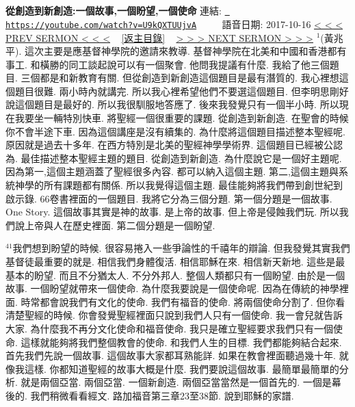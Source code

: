 \documentclass{book}
\begin{document}
\section{}
\label{sec:U9kQXTUUjvA}
\textbf{從創造到新創造:一個故事,一個盼望,一個使命}
\newline
\newline
連結: \href{https://youtube.com/watch?v=U9kQXTUUjvA}{\texttt{ https://youtube.com/watch?v=U9kQXTUUjvA}} ~~~~ 語音日期: 2017-10-16 
\newline
\newline
\hyperref[sec:4SAfUFX37IQ]{\small{< < < PREV SERMON < < <}}
~
\hyperref[sec:index]{\small{[返主目錄]}}
~
\hyperref[sec:Qb_2t8khpeA]{\small{> > > NEXT SERMON > > >}}
\newline
\newline
$^{1}$(黃兆平).
這次主要是應基督神學院的邀請來教導.
基督神學院在北美和中國和香港都有事工.
和橫勝的同工談起說可以有一個聚會.
他問我提議有什麼.
我給了他三個題目.
三個都是和新教育有關.
但從創造到新創造這個題目是最有潛質的.
我心裡想這個題目很難.
兩小時內就講完.
所以我心裡希望他們不要選這個題目.
但李明思剛好說這個題目是最好的.
所以我很馴服地答應了.
後來我發覺只有一個半小時.
所以現在我要坐一輛特別快車.
將聖經一個很重要的課題.
從創造到新創造.
在聖會的時候你不會半途下車.
因為這個講座是沒有續集的.
為什麼將這個題目描述整本聖經呢.
原因就是過去十多年.
在西方特別是北美的聖經神學學術界.
這個題目已經被公認為.
最佳描述整本聖經主題的題目.
從創造到新創造.
為什麼說它是一個好主題呢.
因為第一,這個主題涵蓋了聖經很多內容.
都可以納入這個主題.
第二,這個主題與系統神學的所有課題都有關係.
所以我覺得這個主題.
最佳能夠將我們帶到創世紀到啟示錄.
66卷書裡面的一個題目.
我將它分為三個分題.
第一個分題是一個故事.
One Story.
這個故事其實是神的故事.
是上帝的故事.
但上帝是侵蝕我們玩.
所以我們說上帝與人在歷史裡面.
第二個分題是一個盼望.

$^{41}$我們想到盼望的時候.
很容易捲入一些爭論性的千禧年的辯論.
但我發覺其實我們基督徒最重要的就是.
相信我們身體復活.
相信耶穌在來.
相信新天新地.
這些是最基本的盼望.
而且不分猶太人.
不分外邦人.
整個人類都只有一個盼望.
由於是一個故事.
一個盼望就帶來一個使命.
為什麼我要說是一個使命呢.
因為在傳統的神學裡面.
時常都會說我們有文化的使命.
我們有福音的使命.
將兩個使命分割了.
但你看清楚聖經的時候.
你會發覺聖經裡面只說到我們人只有一個使命.
我一會兒就告訴大家.
為什麼我不再分文化使命和福音使命.
我只是確立聖經要求我們只有一個使命.
這樣就能夠將我們整個教會的使命.
和我們人生的目標.
我們都能夠結合起來.
首先我們先說一個故事.
這個故事大家都耳熟能詳.
如果在教會裡面聽過幾十年.
就像我這樣.
你都知道聖經的故事大概是什麼.
我們要說這個故事.
最簡單最簡單的分析.
就是兩個亞當.
兩個亞當.
一個新創造.
兩個亞當當然是一個首先的.
一個是幕後的.
我們稍微看看經文.
路加福音第三章23至38節.
說到耶穌的家譜.
\end{document}
